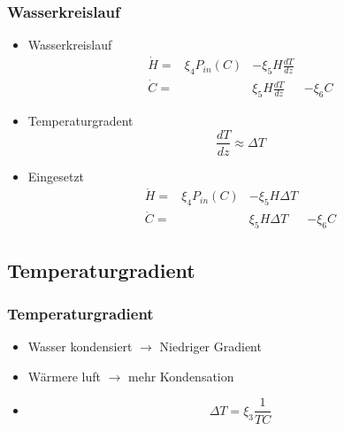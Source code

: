 \documentclass[ngerman]{beamer}
\begin{document}
\begin{frame}
	\frametitle{Wasserkreislauf}
	\begin{itemize}
	
		\item[] Wasserkreislauf
			\begin{equation}
				\begin{matrix}			
					\dot{H} = & \xi_4 P_{in}(C) & - \xi_5  H \frac{dT}{dz} & \\
					\dot{C} = &                 &   \xi_5  H \frac{dT}{dz} & - \xi_6 C
				\end{matrix}	
			\end{equation}
	
		\item[] Temperaturgradent
			\begin{equation}
				\frac{dT}{dz} \approx \Delta T
			\end{equation}
		
		\item[] Eingesetzt
			\begin{equation}
				\begin{matrix}			
					\dot{H} = & \xi_4 P_{in}(C) & - \xi_5 H \Delta T & \\
					\dot{C} = &                 &   \xi_5 H \Delta T & - \xi_6 C
				\end{matrix}	
			\end{equation}			
		
	\end{itemize}
\end{frame}

\subsection{Temperaturgradient}

\begin{frame}
	\frametitle{Temperaturgradient}
	\begin{itemize}
	
		\item[]Wasser kondensiert  $\rightarrow$ Niedriger Gradient
		
		\item[]Wärmere luft $\rightarrow$ mehr Kondensation
	
	
		\item[]
		\begin{equation}
			\Delta T = \xi_3 \frac{1}{TC}
		\end{equation}
	
	
		
	\end{itemize}
\end{frame}
\end{document}
